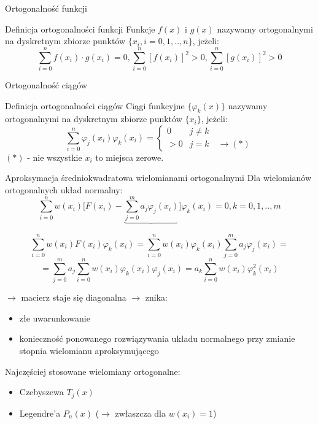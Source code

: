 \begin{frame}{Ortogonalność funkcji}
	\begin{block}{Definicja ortogonalności funkcji}
	Funkcje $f(x)$ i $g(x)$ nazywamy ortogonalnymi na dyskretnym zbiorze punktów $\{x_i,i=0,1,..,n\}$, jeżeli:
    $$\sum_{i=0}^{n}f(x_i)\cdot g(x_i) = 0, \sum_{i=0}^{n}[f(x_i)]^2 > 0,\sum_{i=0}^{n}[g(x_i)]^2 > 0$$
	\end{block}
\end{frame}
\begin{frame}{Ortogonalność ciągów}
	\begin{block}{Definicja ortogonalności ciągów}
	Ciągi funkcyjne $\{\varphi_k(x)\}$ nazywamy ortogonalnymi na dyskretnym zbiorze punktów $\{x_i\}$, jeżeli:
    $$\sum_{i=0}^{n}\varphi_j(x_i)\varphi_k(x_i) = \left\{\begin{array}{cl}
    	0 & j \not= k \\
        >0 & j = k \quad \rightarrow (*)
    \end{array}\right.$$
    $(*)$ - nie wszystkie $x_i$ to miejsca zerowe.
	\end{block}
\end{frame}
\begin{frame}{Aproksymacja średniokwadratowa wielomianami ortogonalnymi}
	Dla wielomianów ortogonalnych układ normalny:
    $$\sum_{i=0}^{n}w(x_i)\Bigg[F(x_i)-\underbrace{\sum_{j=0}^{m}a_j\varphi_j(x_i)}\Bigg]\varphi_k(x_i)=0, k=0,1,..,m$$
    \begin{center}
    	$$\sum_{i=0}^{n}w(x_i)F(x_i)\varphi_k(x_i)=\sum_{i=0}^{n}w(x_i)\varphi_k(x_i)\sum_{j=0}^{m}a_j\varphi_j(x_i)=$$\newline
        $$=\sum_{j=0}^{m}a_j\sum_{i=0}^{n}w(x_i)\varphi_k(x_i)\varphi_j(x_i) = a_k\sum_{i=0}^{n}w(x_i)\varphi_k^2(x_i)$$
    \end{center}
    
\end{frame}
\begin{frame}
	$\rightarrow$ macierz staje się diagonalna $\rightarrow$ znika:
    \begin{itemize}
    \item złe uwarunkowanie
    \item konieczność ponowanego rozwiązywania układu normalnego przy zmianie stopnia wielomianu aproksymującego
    \end{itemize}
	Najczęściej stosowane wielomiany ortogonalne:
    \begin{itemize}
    \item Czebyszewa $T_j(x)$
    \item Legendre'a $P_n(x)$ ($\rightarrow$ zwłaszcza dla $w(x_i) = 1$)
    \end{itemize}
\end{frame}
